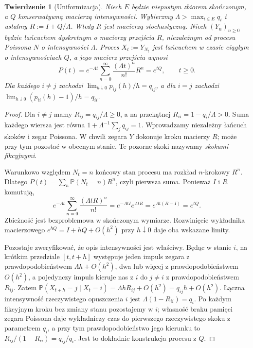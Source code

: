 \documentclass[11pt,a4paper,oneside]{report}
\numberwithin{equation}{chapter}
\theoremstyle{plain}
\newtheorem{twierdzenie}{Twierdzenie}[chapter]
\theoremstyle{definition}
\theoremstyle{remark}
\newcommand{\Prob}{\mathbb{P}}
\begin{document}
\begin{twierdzenie}[Uniformizacja]
\label{thm:uniformization}
Niech $E$ będzie niepustym zbiorem skończonym,
a $Q$ konserwatywną macierzą intensywności.
Wybierzmy $\Lambda>\max_{i\in E}q_i$ i ustalmy
$R:=I+Q/\Lambda$. Wtedy $R$ jest macierzą stochastyczną.
Niech $(Y_n)_{n\ge0}$ będzie łańcuchem dyskretnym o macierzy
przejścia $R$, niezależnym od procesu Poissona $N$ o intensywności
$\Lambda$. Proces $X_t:=Y_{N_t}$ jest łańcuchem w czasie
ciągłym o intensywnościach $Q$, a jego macierz przejścia wynosi
\[
P(t)=e^{-\Lambda t}\sum_{n=0}^\infty
\frac{(\Lambda t)^n}{n!}R^n=e^{tQ},\qquad t\ge0.
\]
Dla każdego $i\ne j$ zachodzi
$\lim_{h\downarrow0}p_{ij}(h)/h=q_{ij}$,
a dla $i=j$ zachodzi
$\lim_{h\downarrow0}(p_{ii}(h)-1)/h=q_{ii}$.
\end{twierdzenie}
\begin{proof}
Dla $i\ne j$ mamy $R_{ij}=q_{ij}/\Lambda\ge0$,
a na przekątnej $R_{ii}=1-q_i/\Lambda>0$.
Suma każdego wiersza jest równa
$1+\Lambda^{-1}\sum_j q_{ij}=1$.
Wprowadzamy niezależny łańcuch skoków i zegar Poissona.
W chwili zegara $Y$ dokonuje kroku macierzy $R$; może
przy tym pozostać w obecnym stanie. Te pozorne skoki
nazywamy \emph{skokami fikcyjnymi}.

Warunkowo względem $N_t=n$ końcowy stan procesu ma
rozkład $n$-krokowy $R^n$. Dlatego
$P(t)=\sum_n\Prob(N_t=n)R^n$, czyli pierwsza suma.
Ponieważ $I$ i $R$ komutują,
\[
e^{-\Lambda t}\sum_{n=0}^\infty\frac{(\Lambda tR)^n}{n!}
=e^{-\Lambda t I}e^{\Lambda tR}
=e^{\Lambda t(R-I)}=e^{tQ}.
\]
Zbieżność jest bezproblemowa w skończonym wymiarze.
Rozwinięcie wykładnika macierzowego
$e^{hQ}=I+hQ+O(h^2)$ przy $h\downarrow0$
daje oba wskazane limity.

Pozostaje zweryfikować, że opis intensywności jest właściwy.
Będąc w stanie $i$, na krótkim przedziale $[t,t+h]$
występuje jeden impuls zegara z prawdopodobieństwem
$\Lambda h+O(h^2)$, dwa lub więcej z prawdopodobieństwem
$O(h^2)$, a pojedynczy impuls kieruje nas z $i$ do $j\ne i$
z prawdopodobieństwem $R_{ij}$. Zatem
$\Prob(X_{t+h}=j\mid X_t=i)=\Lambda hR_{ij}+O(h^2)
=q_{ij}h+O(h^2)$.
Łączna intensywność rzeczywistego opuszczenia $i$ jest
$\Lambda(1-R_{ii})=q_i$. Po każdym fikcyjnym kroku bez
zmiany stanu pozostajemy w $i$; własność braku pamięci
zegara Poissona daje wykładniczy czas do pierwszego
rzeczywistego skoku z parametrem $q_i$, a przy tym
prawdopodobieństwo jego kierunku to
$R_{ij}/(1-R_{ii})=q_{ij}/q_i$.
Jest to dokładnie konstrukcja procesu z $Q$.
\end{proof}
\end{document}
